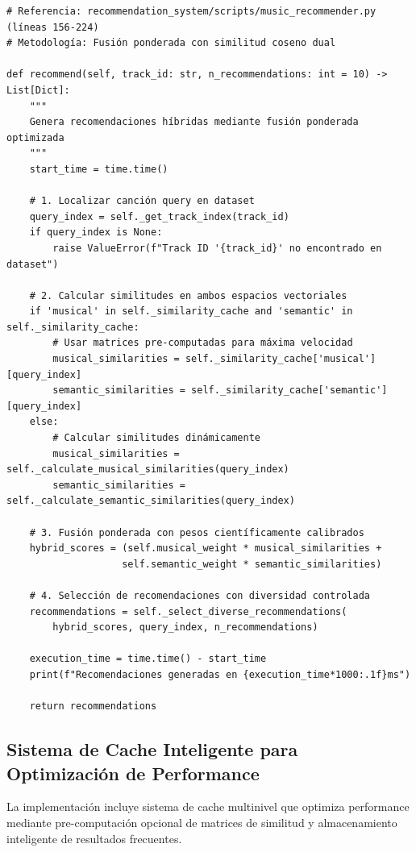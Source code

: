 \documentclass[12pt,a4paper]{article}
\begin{document}
\begin{lstlisting}[caption={Metodología de Fusión Ponderada Optimizada}]
# Referencia: recommendation_system/scripts/music_recommender.py (líneas 156-224)
# Metodología: Fusión ponderada con similitud coseno dual

def recommend(self, track_id: str, n_recommendations: int = 10) -> List[Dict]:
    """
    Genera recomendaciones híbridas mediante fusión ponderada optimizada
    """
    start_time = time.time()

    # 1. Localizar canción query en dataset
    query_index = self._get_track_index(track_id)
    if query_index is None:
        raise ValueError(f"Track ID '{track_id}' no encontrado en dataset")

    # 2. Calcular similitudes en ambos espacios vectoriales
    if 'musical' in self._similarity_cache and 'semantic' in self._similarity_cache:
        # Usar matrices pre-computadas para máxima velocidad
        musical_similarities = self._similarity_cache['musical'][query_index]
        semantic_similarities = self._similarity_cache['semantic'][query_index]
    else:
        # Calcular similitudes dinámicamente
        musical_similarities = self._calculate_musical_similarities(query_index)
        semantic_similarities = self._calculate_semantic_similarities(query_index)

    # 3. Fusión ponderada con pesos científicamente calibrados
    hybrid_scores = (self.musical_weight * musical_similarities +
                    self.semantic_weight * semantic_similarities)

    # 4. Selección de recomendaciones con diversidad controlada
    recommendations = self._select_diverse_recommendations(
        hybrid_scores, query_index, n_recommendations)

    execution_time = time.time() - start_time
    print(f"Recomendaciones generadas en {execution_time*1000:.1f}ms")

    return recommendations
\end{lstlisting}

\subsection{Sistema de Cache Inteligente para Optimización de Performance}

La implementación incluye sistema de cache multinivel que optimiza performance mediante pre-computación opcional de matrices de similitud y almacenamiento inteligente de resultados frecuentes.
\end{document}
